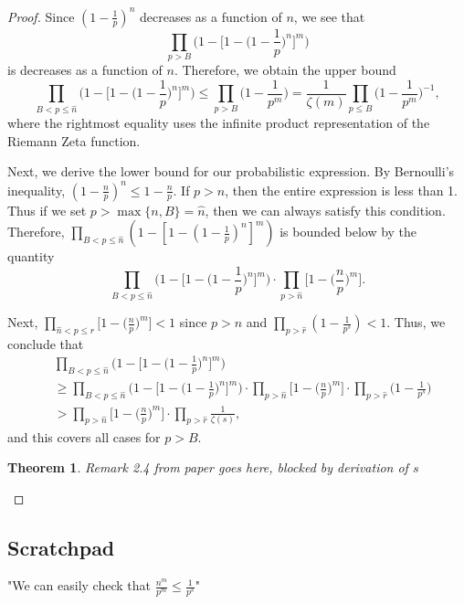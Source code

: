\documentclass[10pt,a4paper]{article}
\newtheorem{theorem}{Theorem}[section]
\theoremstyle{definition}
\theoremstyle{remark}
\begin{document}
\begin{proof}
Since $(1 - \frac{1}{p})^n$ decreases as a function of $n$, we see that $$\prod_{p>B} \Big(1 - \Big[1 - \Big(1 - \frac{1}{p}\Big)^n \Big]^m \Big)$$
is decreases as a function of $n$. Therefore, we obtain the upper bound 
$$\prod_{B<p\leq\hat{n}} \Big(1 - \Big[1 - \Big(1 - \frac{1}{p}\Big)^n \Big]^m \Big) \leq \prod_{p>B} \Big(1 - \frac{1}{p^m}\Big) = \frac{1}{\zeta(m)} \prod_{p\leq B} \Big(1 - \frac{1}{p^m}\Big)^{-1},$$
where the rightmost equality uses the infinite product representation of the Riemann Zeta function.

Next, we derive the lower bound for our probabilistic expression. By Bernoulli's inequality, $(1 - \frac{n}{p})^n \leq 1 - \frac{n}{p}$. If $p>n$, then the entire expression is less than 1. Thus if we set $p>\max\{n,B\}=\hat{n}$, then we can always satisfy this condition. Therefore, $\prod_{B<p\leq\hat{n}} (1-[1-(1-\frac{1}{p})^n]^m)$ is bounded below by the quantity 
$$\prod_{B<p\leq \hat{n}}\Big(1-\Big[1-\Big(1-\frac{1}{p}\Big)^n\Big]^m\Big)\cdot\prod_{p>\hat{n}}\Big[1-\Big(\frac{n}{p}\Big)^m\Big].$$
		
		
Next, \(\prod_{\hat{n}<p\leq\hat{r}}\bigr[1-\bigl(\frac{n}{p}\bigr)^m\bigr] < 1 \) since \(p>n\) and \(
\prod_{p>\hat{r}}(1-\frac{1}{p^s})<1\). Thus, we conclude that \begin{align}
	 	&\prod_{B<p\leq\hat{n}}\Big(1-\Big[1-\Big(1-\frac{1}{p}\Big)^n\Big]^m\Big)\\ &\geq \prod_{B<p\leq \hat{n}}\Big(1-\Big[1-\Big(1-\frac{1}{p}\Big)^n \Big]^m\Big) \cdot \prod_{p>\hat{n}}\Big[1 - \Big(\frac{n}{p}\Big)^m\Big] \cdot \prod_{p>\hat{r}}\Big(1-\frac{1}{p^s}\Big)\\ &>
	 	\prod_{p>\hat{n}} \Big[1-\Big(\frac{n} {p} \Big)^m \Big]\cdot \prod_{p>\hat{r}}\frac{1}{\zeta(s)},
\end{align} and this covers all cases for \(p>B\). 
	 
\begin{theorem}
Remark 2.4 from paper goes here, blocked by derivation of $s$
\end{theorem} 
	 
\end{proof}

\subsection{Scratchpad}
	"We can easily check that \(\frac{n^m}{p^m}\leq \frac{1}{p^s}\)" 
	
\end{document}
